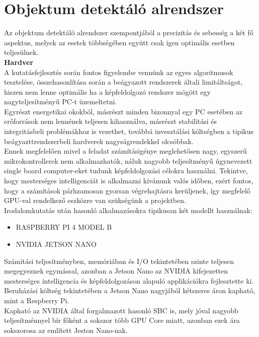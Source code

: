 \documentclass{article}
\begin{document}
\section{Objektum detektáló alrendszer}
Az objektum detektáló alrendszer szempontjából a precizitás és sebesség a két fő aspektus,
melyek az esetek többségében együtt csak igen optimális esetben teljesülnek.\vspace{5pt}\\
\textbf{Hardver}\\
A kutatásfejlesztés során fontos figyelembe vennünk az egyes algoritmusok tesztelése,
összehasonlítása során a beágyazott rendszerek általi limitáltságot, hiszen nem lenne
optimális ha a képfeldolgozó rendszer mögött egy nagyteljesítményű PC-t üzemeltetni.\\
Egyrészt energetikai okokból, másrészt minden bizonnyal egy PC esetében az erőforrások
nem lennének teljesen kihasználva, másrészt stabilitási és integritásbeli problémákhoz
is vezethet, továbbá invesztálási költségben a tipikus beágyazttrendszerbeli hardverek
nagyságrendekkel olcsóbbak.\vspace{5pt}\\
Ennek megfelelően mivel a feladat számításigénye meglehetősen nagy, egyszerű mikrokontrollerek
nem alkalmazhatók, náluk nagyobb teljesítményű úgynevezett single board computer-eket 
tudunk képfeldolgozási célokra használni. Tekintve, hogy mesterséges intelligenciát is 
alkalmazni kívánunk valós időben, ezért fontos, hogy a számítások párhzamosan gyorsan
végrehajtásra kerüljenek, így megfelelő GPU-val rendelkező eszközre van szükségünk a projektben.\vspace{5pt}\\
Irodalomkutatás után hasonló alkalmazásokra tipikusan két modellt használnak:
\begin{itemize}
    \item RASPBERRY PI 4 MODEL B
    \item NVIDIA JETSON NANO
\end{itemize}
Számítási teljesítményben, memóriában és I/O tekintetében szinte teljesen megegyeznek 
egymással, azonban a Jetson Nano az NVIDIA kifejezetten mesterséges intelligencia és 
képfeldolgozáson alapuló applikációkra fejlesztette ki.\\
Beruházási költség tekintetében a Jetson Nano nagyjából kétszeres áron kapható, mint 
a Respberry Pi.\\
Kapható az NVIDIA által forgalmazott hasonló SBC is, mely jóval nagyobb teljesítménnyel bír
főként a sokszor több GPU Core miatt, azonban ezek ára sokszorosa az említett Jeston Nano-nak.\vspace{5pt}\\
\end{document}
